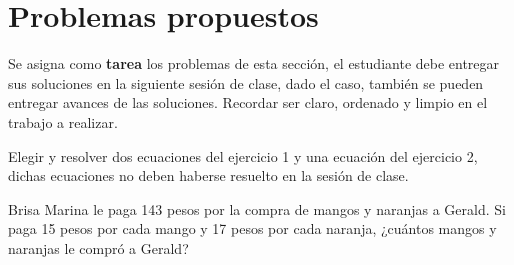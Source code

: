 \section{Problemas propuestos}

Se asigna como \textbf{tarea} los problemas de esta sección, el estudiante debe entregar sus soluciones en la siguiente
sesión de clase, dado el caso, también se pueden entregar avances de las soluciones.
Recordar ser claro, ordenado y limpio en el trabajo a realizar.

\begin{exercise}
    Elegir y resolver dos ecuaciones del ejercicio 1 y una ecuación del ejercicio 2,
    dichas ecuaciones no deben haberse resuelto en la sesión de clase.
\end{exercise}

\begin{problem}
    Brisa Marina le paga 143 pesos por la compra de mangos y naranjas a Gerald.
    Si paga 15 pesos por cada mango y 17 pesos por cada naranja, ¿cuántos mangos y naranjas le compró a Gerald?
\end{problem}